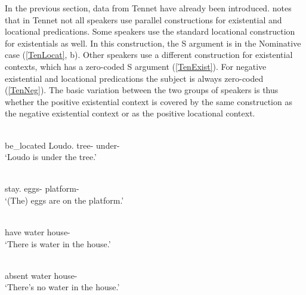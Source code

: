 In the previous section, data from Tennet have already been introduced.
\citet[236]{Randal:1998} notes that in Tennet not all speakers use parallel constructions for existential and locational predications.
Some speakers use the standard locational construction for existentials as well. 
In this construction, the S argument is in the Nominative case (\ref{TenLocat}, b).
Other speakers use a different construction for existential contexts, which has a zero-coded S argument (\ref{TenExist}). 
For negative existential and locational predications the subject is always zero-coded (\ref{TenNeg}).
The basic variation between the two groups of speakers is thus whether the positive existential context is covered by the same construction as the negative existential context or as the positive locational context. 

\begin{exe}\ex{}
\begin{xlist}
\ex\label{TenLocat}\gll{} \textbf{}  \\
be\_located Loudo.\nom{} tree-\obl{} under-\obl{}\\
\glt `Loudo is under the tree.'

\ex\label{TenLocation}\gll{}  \\
stay.\pl{} eggs-\nom{} platform-\obl{}\\
\glt `(The) eggs are on the platform.' 
\end{xlist}
\end{exe}

\pagebreak

\begin{exe}\ex{}
\begin{xlist}
\ex\label{TenExist}\gll{} \textbf{} \\
have water house-\obl{}\\
\glt `There is water in the house.' 

\ex\label{TenNeg}\gll{} \textbf{} \\
absent water house-\obl{}\\
\glt `There's no water in the house.' 
\end{xlist}
\end{exe}

